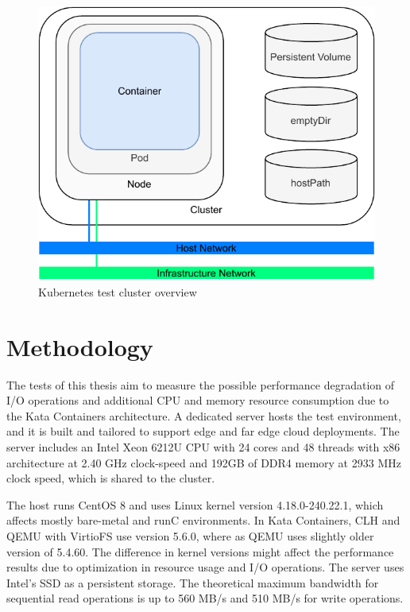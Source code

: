 \begin{figure}[ht]
  \begin{center}
    \includegraphics[width=12cm]{images/TestArchitectureClusterSimple.pdf}
    \caption{Kubernetes test cluster overview}
    \label{fig:TestArchitectureCluster}
  \end{center}
\end{figure}

\section{Methodology}

The tests of this thesis aim to measure the possible performance degradation of I/O operations and additional CPU and memory resource consumption due to the Kata Containers architecture. A dedicated server
hosts the test environment, and it is built and tailored to support edge and far edge cloud deployments. The server includes an Intel Xeon 6212U CPU with 24 cores and 48 threads with x86 architecture at 2.40 GHz clock-speed and 192GB of DDR4 memory at 2933 MHz clock speed, which is shared to the cluster.

The host runs CentOS 8 and uses Linux kernel version 4.18.0-240.22.1, which affects mostly bare-metal and runC environments. In Kata Containers, CLH and QEMU with VirtioFS use version 5.6.0, where as QEMU uses slightly older version of 5.4.60. The difference in kernel versions might affect the performance results due to optimization in resource usage and I/O operations. The server uses Intel's SSD \cite{IntelSSD} as a persistent storage. The theoretical maximum bandwidth for sequential read operations is up to 560 MB/s and 510 MB/s for write operations.

